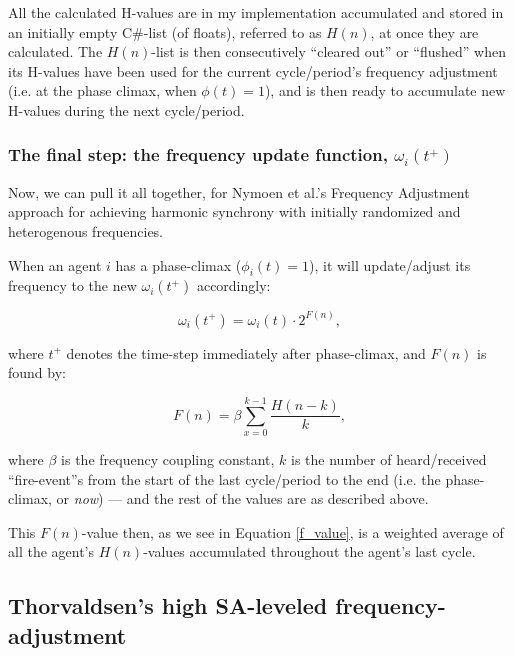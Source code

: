 	All the calculated H-values are in my implementation accumulated and stored in an initially empty C\#-list (of floats), referred to as $H(n)$, at once they are calculated. The $H(n)$-list is then consecutively ``cleared out'' or ``flushed'' when its H-values have been used for the current cycle/period's frequency adjustment (i.e. at the phase climax, when $\phi(t)=1$), and is then ready to accumulate new H-values during the next cycle/period.
	
	\subsubsection{The final step: the frequency update function, $\omega_i(t^+)$}
	
	Now, we can pull it all together, for Nymoen et al.'s Frequency Adjustment approach for achieving harmonic synchrony with initially randomized and heterogenous frequencies.
	
	When an agent $i$ has a phase-climax ($\phi_i(t)=1$), it will update/adjust its frequency to the new $\omega_i(t^+)$ accordingly:
	
	\begin{equation}
	\label{freq_adj}
		\omega_i(t^+) = \omega_i(t) \cdot 2^{F(n)},
	\end{equation}
	
	where $t^+$ denotes the time-step immediately after phase-climax, and $F(n)$ is found by:
	
	\begin{equation}
	\label{f_value}
		F(n) = \beta\sum_{x=0}^{k-1}\frac{H(n-k)}{k},
	\end{equation}
	
	where $\beta$ is the frequency coupling constant, $k$ is the number of heard/received ``fire-event''s from the start of the last cycle/period to the end (i.e. the phase-climax, or \textit{now}) — and the rest of the values are as described above.
	
	This $F(n)$-value then, as we see in Equation \eqref{f_value}, is a weighted average of all the agent's $H(n)$-values accumulated throughout the agent's last cycle.
	
	
	
	
	

	
	
	\subsection{Thorvaldsen's high SA-leveled frequency-adjustment}
	
